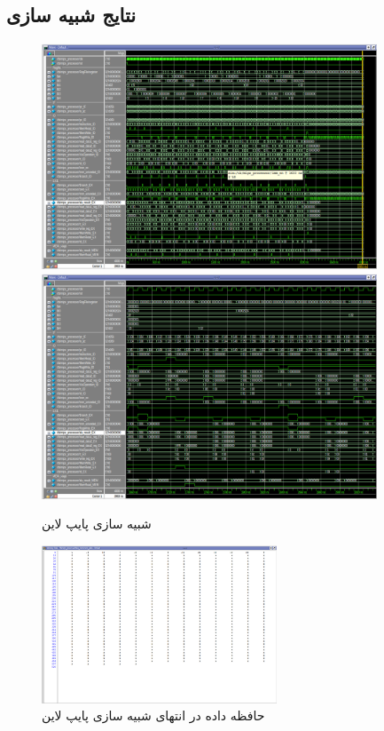 \documentclass[11pt, a4paper]{article}
\begin{document}
	\subsection{نتایج شبیه سازی}
	
	\begin{figure}[H]
		\begin{center}
			\includegraphics[width=10cm]{Photos/7.png}
			\includegraphics[width=10cm]{Photos/8.png}
		\end{center}
		\caption{شبیه سازی پایپ لاین}
		\label{Pipeline_sim}
	\end{figure}
	
	\begin{figure}[H]
		\begin{center}
			\includegraphics[width=7cm]{Photos/9.png}
		\end{center}
		\caption{حافظه داده در انتهای شبیه سازی پایپ لاین}
		\label{Pipeline_data_mem}
	\end{figure}
	
	

 
 
	
\end{document}
